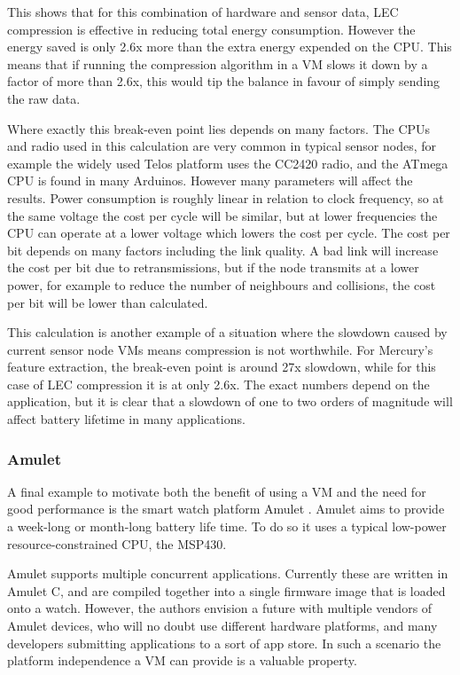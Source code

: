This shows that for this combination of hardware and sensor data, LEC compression is effective in reducing total energy consumption. However the energy saved is only 2.6x more than the extra energy expended on the CPU. This means that if running the compression algorithm in a VM slows it down by a factor of more than 2.6x, this would tip the balance in favour of simply sending the raw data.

Where exactly this break-even point lies depends on many factors. The CPUs and radio used in this calculation are very common in typical sensor nodes, for example the widely used Telos platform \cite{Polastre:2005ut} uses the CC2420 radio, and the ATmega CPU is found in many Arduinos. However many parameters will affect the results. Power consumption is roughly linear in relation to clock frequency, so at the same voltage the cost per cycle will be similar, but at lower frequencies the CPU can operate at a lower voltage which lowers the cost per cycle. The cost per bit depends on many factors including the link quality. A bad link will increase the cost per bit due to retransmissions, but if the node transmits at a lower power, for example to reduce the number of neighbours and collisions, the cost per bit will be lower than calculated.

This calculation is another example of a situation where the slowdown caused by current sensor node VMs means compression is not worthwhile. For Mercury's feature extraction, the break-even point is around 27x slowdown, while for this case of LEC compression it is at only 2.6x. The exact numbers depend on the application, but it is clear that a slowdown of one to two orders of magnitude will affect battery lifetime in many applications.

\subsubsection{Amulet}
A final example to motivate both the benefit of using a VM and the need for good performance is the smart watch platform Amulet \cite{Hester:2016je}. Amulet aims to provide a week-long or month-long battery life time. To do so it uses a typical low-power resource-constrained CPU, the MSP430.

Amulet supports multiple concurrent applications. Currently these are written in Amulet C, and are compiled together into a single firmware image that is loaded onto a watch. However, the authors envision a future with multiple vendors of Amulet devices, who will no doubt use different hardware platforms, and many developers submitting applications to a sort of app store. In such a scenario the platform independence a VM can provide is a valuable property.

